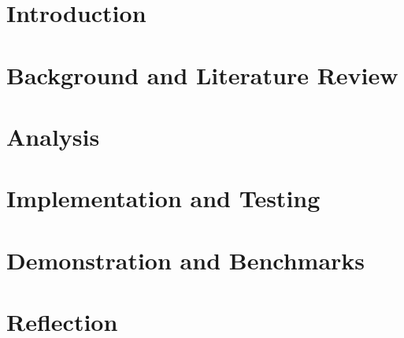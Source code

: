 





\thispagestyle{plain}

\setcounter{secnumdepth}{2} %
\setcounter{tocdepth}{2} %
\tableofcontents*

\setpagewiselinenumbers
\modulolinenumbers[5]
\linenumbers

\chapter{Introduction}


\chapter{Background and Literature Review}





% 
\newpage

\chapter{Analysis}

\newpage

\chapter{Implementation and Testing}






\newpage

\chapter{Demonstration and Benchmarks}


\newpage

\chapter{Reflection}

\newpage

